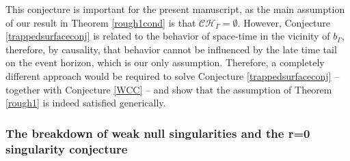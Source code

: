 \documentclass[10pt,a4paper]{article}
\theoremstyle{plain}
\theoremstyle{remark}
\theoremstyle{definition}
\theoremstyle{plain}
\theoremstyle{remark}
\theoremstyle{definition}
\numberwithin{equation}{section}
\begin{document}
This conjecture is important for the present manuscript, as the main assumption of our result in Theorem \ref{rough1cond} is that $\mathcal{CH}_{\Gamma}=\emptyset$. However, Conjecture \ref{trappedsurfaceconj} is related to the behavior of space-time in the vicinity of $b_{\Gamma}$, therefore, by causality, that behavior cannot be influenced by the late time tail on the event horizon, which is our only assumption. Therefore, a completely different approach would be required to solve Conjecture \ref{trappedsurfaceconj} -- together with Conjecture \ref{WCC} -- and show that the assumption of Theorem \ref{rough1} is indeed satisfied generically.  

\subsubsection{The breakdown of weak null singularities and the r=0 singularity conjecture}
\end{document}
